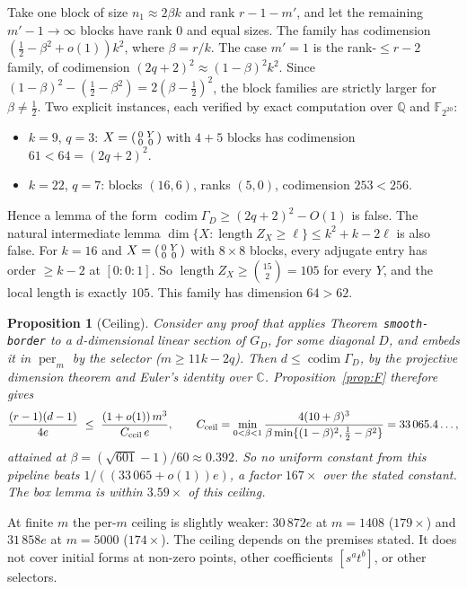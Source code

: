 \documentclass[11pt]{amsart}
\newtheorem{proposition}[theorem]{Proposition}
\theoremstyle{remark}
\DeclareMathOperator{\per}{per}
\DeclareMathOperator{\codim}{codim}
\DeclareMathOperator{\len}{length}
\begin{document}
Take one block of size $n_1\approx2\beta k$ and rank $r-1-m'$, and let the
remaining $m'-1\to\infty$ blocks have rank $0$ and equal sizes. The family has
codimension $(\tfrac12-\beta^2+o(1))k^2$, where $\beta=r/k$. The case $m'=1$
is the rank-$\le r-2$ family, of codimension $(2q+2)^2\approx(1-\beta)^2k^2$.
Since $(1-\beta)^2-(\tfrac12-\beta^2)=2(\beta-\tfrac12)^2$, the block families
are strictly larger for $\beta\ne\tfrac12$. Two explicit instances, each
verified by exact computation over $\mathbb Q$ and $\mathbb F_{2^{20}}$:
\begin{itemize}
\item $k=9$, $q=3$: $X=\begin{psmallmatrix}0&Y\\0&0\end{psmallmatrix}$ with
$4+5$ blocks has codimension $61<64=(2q+2)^2$.
\item $k=22$, $q=7$: blocks $(16,6)$, ranks $(5,0)$, codimension $253<256$.
\end{itemize}
Hence a lemma of the form $\codim\Gamma_D\ge(2q+2)^2-O(1)$ is false. The
natural intermediate lemma $\dim\{X:\len Z_X\ge\ell\}\le k^2+k-2\ell$ is also
false. For $k=16$ and $X=\begin{psmallmatrix}0&Y\\0&0\end{psmallmatrix}$ with
$8\times8$ blocks, every adjugate entry has order $\ge k-2$ at $[0:0:1]$.
So $\len Z_X\ge\binom{15}2=105$ for every $Y$, and the local length is exactly
$105$. This family has dimension $64>62$.

\begin{proposition}[Ceiling]\label{prop:ceiling}
Consider any proof that applies Theorem~\texttt{smooth-border} to a
$d$-dimensional linear section of $G_D$, for some diagonal $D$, and embeds it
in $\per_m$ by the selector ($m\ge11k-2q$). Then $d\le\codim\Gamma_D$, by the
projective dimension theorem and Euler's identity over $\mathbb C$.
Proposition~\ref{prop:F} therefore gives
\[
\frac{(r-1)(d-1)}{4e}\ \le\ \frac{(1+o(1))\,m^3}{C_{\rm ceil}\,e},\qquad
C_{\rm ceil}=\min_{0<\beta<1}\frac{4(10+\beta)^3}{\beta\min\{(1-\beta)^2,\tfrac12-\beta^2\}}
=33\,065.4\ldots,
\]
attained at $\beta=(\sqrt{601}-1)/60\approx0.392$. So no uniform constant from
this pipeline beats $1/((33\,065+o(1))e)$, a factor $167\times$ over the stated
constant. The box lemma is within $3.59\times$ of this ceiling.
\end{proposition}

At finite $m$ the per-$m$ ceiling is slightly weaker: $30\,872e$ at $m=1408$
($179\times$) and $31\,858e$ at $m=5000$ ($174\times$). The ceiling depends on
the premises stated. It does not cover initial forms at non-zero points,
other coefficients $[s^at^b]$, or other selectors.
\end{document}
